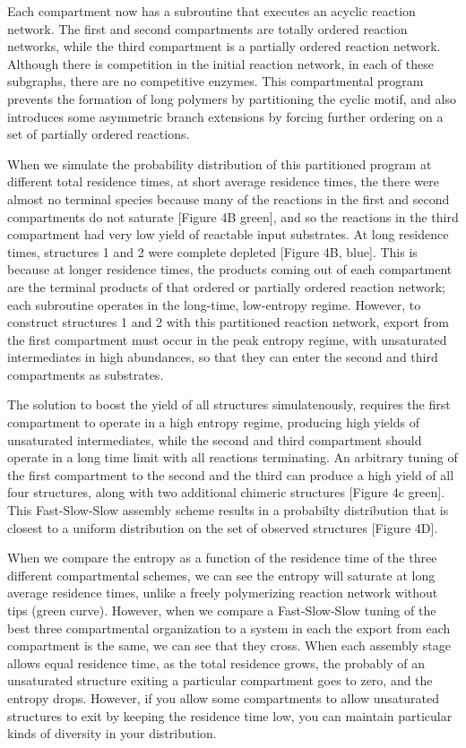 \documentclass[twocolumn]{article}
\begin{document}
Each compartment now has a subroutine that executes an acyclic reaction network. The first and second compartments are totally ordered reaction networks, while the third compartment is a partially ordered reaction network. Although there is competition in the initial reaction network, in each of these subgraphs, there are no competitive enzymes. This compartmental program prevents the formation of long polymers by partitioning the cyclic motif, and also introduces some asymmetric branch extensions by forcing further ordering on a set of partially ordered reactions.  

When we simulate the probability distribution of this partitioned program at different total residence times, at short average residence times, the there were almost no terminal species because many of the reactions in the first and second compartments do not saturate [Figure 4B green], and so the reactions in the third compartment had very low yield of reactable input substrates. At long residence times, structures 1 and 2 were complete depleted [Figure 4B, blue]. This is because at longer residence times, the products coming out of each compartment are the terminal products of that ordered or partially ordered reaction network; each subroutine operates in the long-time, low-entropy regime. However, to construct structures 1 and 2 with this partitioned reaction network, export from the first compartment must occur in the peak entropy regime, with unsaturated intermediates in high abundances, so that they can enter the second and third compartments as substrates. 

The solution to boost the yield of all structures simulatenously, requires the first compartment to operate in a high entropy regime, producing high yields of unsaturated intermediates, while the second and third compartment should operate in a long time limit with all reactions terminating. An arbitrary tuning of the first compartment to the second and the third can produce a high yield of all four structures, along with two additional chimeric structures [Figure 4c green]. This Fast-Slow-Slow assembly scheme results in a probabilty distribution that is closest to a uniform distribution on the set of observed structures [Figure 4D].

When we compare the entropy as a function of the residence time of the three different compartmental schemes, we can see the entropy will saturate at long average residence times, unlike a freely polymerizing reaction network without tips (green curve). However, when we compare a Fast-Slow-Slow tuning of the best three compartmental organization to a system in each the export from each compartment is the same, we can see that they cross. When each assembly stage allows equal residence time, as the total residence grows, the probably of an unsaturated structure exiting a particular compartment goes to zero, and the entropy drops. However, if you allow some compartments to allow unsaturated structures to exit by keeping the residence time low, you can maintain particular kinds of diversity in your distribution. \\
\end{document}
